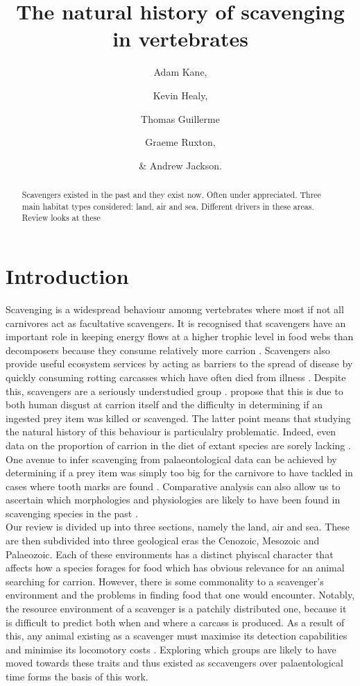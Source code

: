 \documentclass[a4paper,12pt]{article}
\title{The natural history of scavenging in vertebrates}
\author{Adam Kane, \and Kevin Healy, \and Thomas Guillerme \and Graeme Ruxton, \and \& Andrew Jackson.}
\begin{document}
\maketitle


\begin{abstract}
  Scavengers existed in the past and they exist now. 
  Often under appreciated. 
  Three main habitat types considered: land, air and sea. 
  Different drivers in these areas. 
  Review looks at these 
\end{abstract}


\newpage


\section*{Introduction}
Scavenging is a widespread behaviour amonng vertebrates where most if not all carnivores act as facultative scavengers. 
It is recognised that scavengers have an important role in keeping energy flows at a higher trophic level in food webs than decomposers because they consume relatively more carrion \citep{devault2003scavenging}. 
Scavengers also provide useful ecosystem services by acting as barriers to the spread of disease by quickly consuming rotting carcasses which have often died from illness \citep{ogada2012dropping}.
Despite this, scavengers are a seriously understudied group \citep{sekercioglu2006increasing,selva2007nested,wilson2011scavenging}. 
\cite{devault2003scavenging} propose that this is due to both human disgust at carrion itself and the difficulty in determining if an ingested prey item was killed or scavenged. 
The latter point means that studying the natural history of this behaviour is particulalry problematic. Indeed, even data on the proportion of carrion in the diet of extant species are sorely lacking \citep{benbow2015introduction}. 
\\ One avenue to infer scavenging from palaeontological data can be achieved by determining if a prey item was simply too big for the carnivore to have tackled in cases where tooth marks are found \citep{pobiner2008paleoecological}. 
Comparative analysis can also allow us to ascertain which morphologies and physiologies are likely to have been found in scavenging species in the past \citep{ruxton2004obligate}. 
\\ Our review is divided up into three sections, namely the land, air and sea. 
These are then subdivided into three geological eras the Cenozoic, Mesozoic and Palaeozoic. 
Each of these environments has a distinct phyiscal character that affects how a species forages for food which has obvious relevance for an animal searching for carrion.  
However, there is some commonality to a scavenger's environment and the problems in finding food that one would encounter. 
Notably, the resource environment of a scavenger is a patchily distributed one, because it is difficult to predict both when and where a carcass is produced. 
As a result of this, any animal existing as a scavenger must maximise its detection capabilities and minimise its locomotory costs \citep{ruxton2004obligate}.
Exploring which groups are likely to have moved towards these traits and thus existed as sccavengers over palaentological time forms the basis of this work. 
\end{document}
